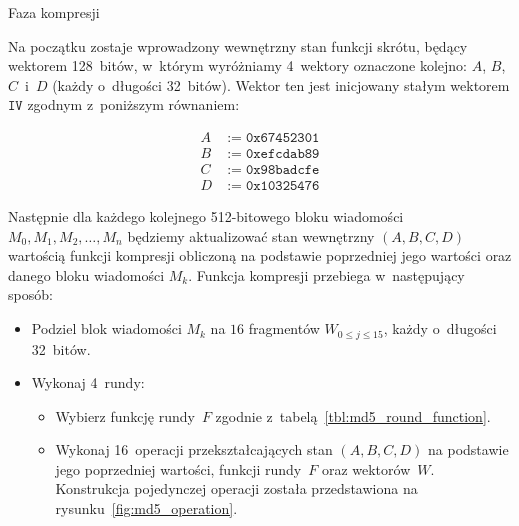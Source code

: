 \documentclass[12pt,a4paper,twoside]{article}
\begin{document}
\begin{myenumerate}
\begin{myenumerate}
\begin{itemize}
        \end{itemize}

    \end{myenumerate}

    \item Faza kompresji

    \begin{myenumerate}

        \item Na początku zostaje wprowadzony wewnętrzny stan funkcji skrótu,
        będący wektorem 128~bitów, w~którym wyróżniamy 4~wektory oznaczone
        kolejno: $A$, $B$, $C$~i~$D$ (każdy o~długości 32~bitów). Wektor ten
        jest inicjowany stałym wektorem $\mathtt{IV}$ zgodnym z~poniższym
        równaniem:

        \[
            \begin{aligned}
                A &:= \mathtt{0x67452301} \\
                B &:= \mathtt{0xefcdab89} \\
                C &:= \mathtt{0x98badcfe} \\
                D &:= \mathtt{0x10325476}
            \end{aligned}
        \]

        \item Następnie dla każdego kolejnego 512-bitowego bloku wiadomości
        \break $M_0, M_1, M_2, \ldots, M_n$ będziemy aktualizować stan
        wewnętrzny $(A,B,C,D)$ wartością funkcji kompresji obliczoną na
        podstawie poprzedniej jego wartości oraz danego bloku wiadomości $M_k$.
        Funkcja kompresji przebiega w~następujący sposób:

        \begin{itemize}

            \item Podziel blok wiadomości $M_k$ na $16$ fragmentów $W_{0 \leq j
            \leq 15}$, każdy o~długości 32~bitów.

            \pagebreak
            \item Wykonaj 4~rundy:

            \begin{itemize}

                \item Wybierz funkcję rundy~$F$ zgodnie
                z~tabelą~\ref{tbl:md5_round_function}.

                \item Wykonaj 16~operacji przekształcających stan $(A,B,C,D)$
                na podstawie jego poprzedniej wartości, funkcji rundy~$F$ oraz
                wektorów~$W$. Konstrukcja pojedynczej operacji została
                przedstawiona na rysunku~\ref{fig:md5_operation}.


\end{itemize}
\end{itemize}
\end{myenumerate}
\end{myenumerate}
\end{document}
